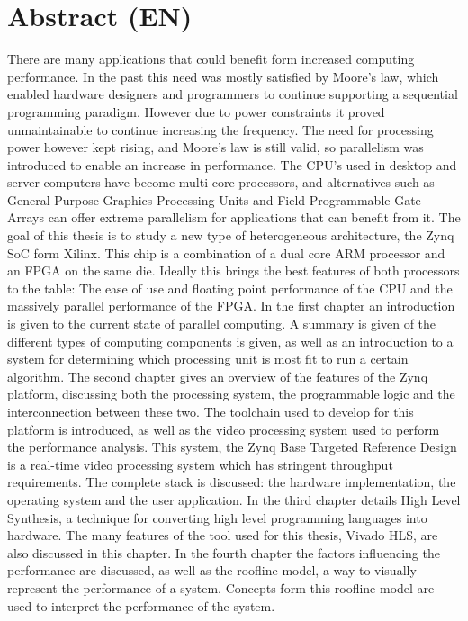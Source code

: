 

\chapter*{Abstract (EN)}

There are many applications that could benefit form increased computing performance. In the past this need was mostly satisfied by Moore's law, which enabled hardware designers and programmers to continue supporting a sequential programming paradigm. However due to power constraints it proved unmaintainable to continue increasing the frequency. The need for processing power however kept rising, and Moore's law is still valid, so parallelism was introduced to enable an increase in performance. The CPU's used in desktop and server computers have become multi-core processors, and alternatives such as General Purpose Graphics Processing Units and Field Programmable Gate Arrays can offer extreme parallelism for applications that can benefit from it. The goal of this thesis is to study a new type of heterogeneous architecture, the Zynq SoC form Xilinx. This chip is a combination of a dual core ARM processor and an FPGA on the same die. Ideally this brings the best features of both processors to the table: The ease of use and floating point performance of the CPU and the massively parallel performance of the FPGA. In the first chapter an introduction is given to the current state of parallel computing. A summary is given of the different types of computing components is given, as well as an introduction to a system for determining which processing unit is most fit to run a certain algorithm. The second chapter gives an overview of the features of the Zynq platform, discussing both the processing system, the programmable logic and the interconnection between these two. The toolchain used to develop for this platform is introduced, as well as the video processing system used to perform the performance analysis. This system, the Zynq Base Targeted Reference Design is a real-time video processing system which has stringent throughput requirements. The complete stack is discussed: the hardware implementation, the operating system and the user application. In the third chapter details High Level Synthesis, a technique for converting high level programming languages into hardware. The many features of the tool used for this thesis, Vivado HLS, are also discussed in this chapter. In the fourth chapter the factors influencing the performance are discussed, as well as the roofline model, a way to visually represent the performance of a system. Concepts form this roofline model are used to interpret the performance of the system.
